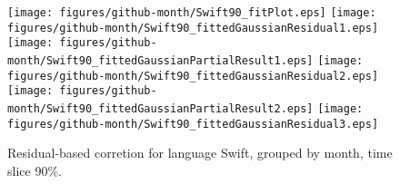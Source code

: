 \begin{figure}[t]
\centering
{}
{\texttt{[image: figures/github-month/Swift90\_fitPlot.eps]}}
{\texttt{[image: figures/github-month/Swift90\_fittedGaussianResidual1.eps]}}
{\texttt{[image: figures/github-month/Swift90\_fittedGaussianPartialResult1.eps]}}
{\texttt{[image: figures/github-month/Swift90\_fittedGaussianResidual2.eps]}}
{\texttt{[image: figures/github-month/Swift90\_fittedGaussianPartialResult2.eps]}}
{\texttt{[image: figures/github-month/Swift90\_fittedGaussianResidual3.eps]}}
\caption{Residual-based corretion for language Swift, grouped by month, time slice 90\%.}
\end{figure}


\FloatBarrier


